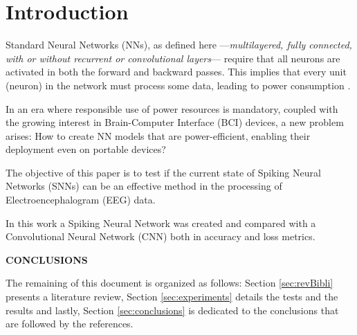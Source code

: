 \section{Introduction}
	\label{introduction}
	\par Standard Neural Networks (NNs), as defined here —\textit{multilayered, fully connected, with or without recurrent or convolutional layers}— require that all neurons are activated in both the forward and backward passes. This implies that every unit (neuron) in the network must process some data, leading to power consumption \cite{10242251}.
	
	\par In an era where responsible use of power resources is mandatory, coupled with the growing interest in Brain-Computer Interface (BCI) devices, a new problem arises: How to create NN models that are power-efficient, enabling their deployment even on portable devices?

	\par The objective of this paper is to test if the current state of Spiking Neural Networks (SNNs) can be an effective method in the processing of Electroencephalogram (EEG) data.
	
	\par In this work a Spiking Neural Network was created and compared with a Convolutional Neural Network (CNN) both in accuracy and loss metrics. 

	\par \textbf{CONCLUSIONS}
	
	\par The remaining of this document is organized as follows: Section \ref{sec:revBibli} presents a literature review, Section \ref{sec:experiments} details the tests and the results and lastly, Section \ref{sec:conclusions} is dedicated to the conclusions that are followed by the references. 